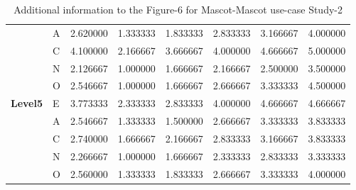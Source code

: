 \begin{table}[H]
\begin{center}
\begin{tabular}{ |p{2cm}| p{0.5cm}|p{1.5cm}|p{1.5cm}| p{1.5cm}|p{1.5cm}|p{1.5cm}| p{1.5cm}| }
&     A & 2.620000 & 1.333333 &1.833333 &2.833333 &3.166667 &4.000000\\
& C & 4.100000 & 2.166667 &3.666667 &4.000000& 4.666667 &5.000000\\
&       N& 2.126667 & 1.000000 &1.666667 &2.166667 &2.500000 &3.500000\\
&          O & 2.546667 & 1.000000 &1.666667& 2.666667 &3.333333 &4.500000\\
 \hline 
 \hline 
 \multirow{5}{*}{\textbf{Level5}} 
&      E & 3.773333 & 2.333333 &2.833333& 4.000000 &4.666667 &4.666667\\
&     A & 2.546667 & 1.333333 &1.500000 &2.666667& 3.333333 &3.833333\\
& C & 2.740000 & 1.666667 &2.166667 &2.833333& 3.166667 &3.833333\\
&       N & 2.266667 & 1.000000 &1.666667 &2.333333 &2.833333& 3.333333\\
&          O & 2.560000 & 1.333333 &1.833333 &2.666667 &3.333333 &4.000000\\
 \hline 
\end{tabular}
\end{center}
\caption{Additional information to the Figure-6 for Mascot-Mascot use-case Study-2}
\end{table}

